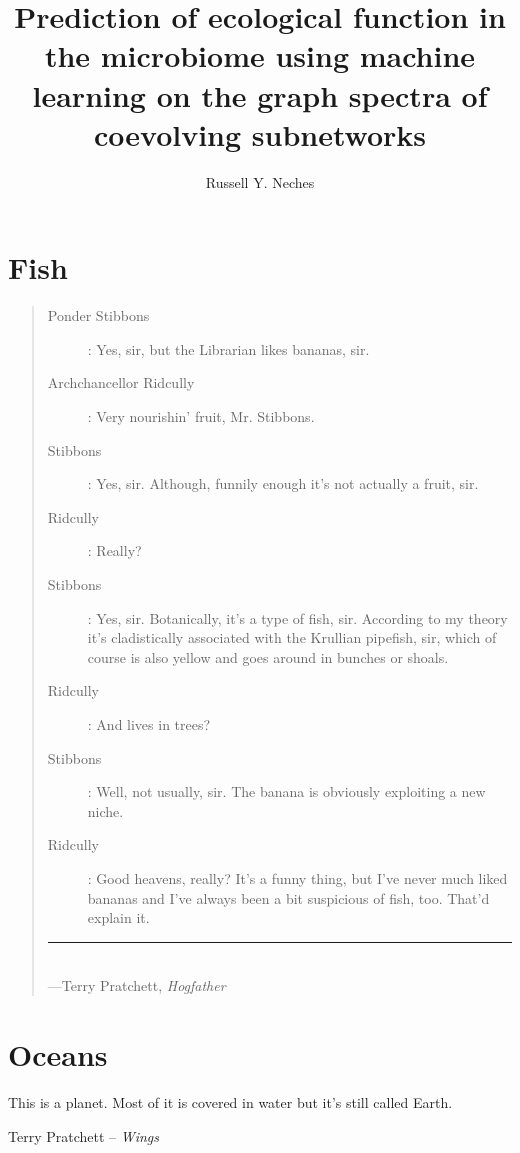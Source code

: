 \documentclass[PhD]{ucdavisthesis}
\title{Prediction of ecological function in the microbiome using machine learning on the graph spectra of coevolving subnetworks}
\author{Russell Y. Neches}
\begin{document}
\makeintropages

%

\begin{refsection}
\newrefsection

\end{refsection}

\part{Fish}

\begin{quote}
\begin{description}
\item[\sc Ponder Stibbons] : Yes, sir, but the Librarian likes bananas, sir.
\item[\sc Archchancellor Ridcully] : Very nourishin' fruit, Mr. Stibbons.
\item[\sc Stibbons] : Yes, sir. Although, funnily enough it's not actually a fruit, sir.
\item[\sc Ridcully] : Really?
\item[\sc Stibbons] : Yes, sir. Botanically, it's a type of fish, sir. According to my theory it's cladistically associated with the Krullian pipefish, sir, which of course is also yellow and goes around in bunches or shoals.
\item[\sc Ridcully] : And lives in trees?
\item[\sc Stibbons] : Well, not usually, sir. The banana is obviously exploiting a new niche.
\item[\sc Ridcully] : Good heavens, really? It's a funny thing, but I've never much liked bananas and I've always been a bit suspicious of fish, too. That'd explain it.
\end{description}
\rule{0.8\textwidth}{.4pt}\\
\hspace*{\fill}---Terry Pratchett, {\em Hogfather}
\end{quote}

\clearpage





\part{Oceans}

\epigraph{This is a planet. Most of it is covered in water but it's still
called Earth.}{Terry Pratchett -- {\em Wings}}
\end{document}
